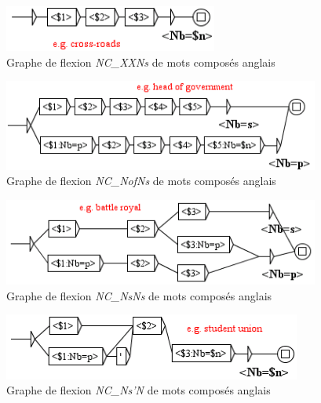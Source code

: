 \begin{figure}[!htb]
  \centering
  \includegraphics[width=7cm]{resources/img/NC'XXNs'EN.png}
  \caption{Graphe de flexion \emph{NC\_XXNs} de mots composés anglais}
  \label{fig:NC'XXNs'EN}
\end{figure}

\begin{figure}[!htb]
  \centering
  \includegraphics[width=10.4cm]{resources/img/NC'NofNs'EN.png}
  \caption{Graphe de flexion \emph{NC\_NofNs} de mots composés anglais}
  \label{fig:NC'NofNs'EN}
\end{figure}

\begin{figure}[!htb]
  \centering
  \includegraphics[width=10.4cm]{resources/img/NC'NsNs'EN.png}
  \caption{Graphe de flexion \emph{NC\_NsNs} de mots composés anglais}
  \label{fig:NC'NsNs'EN}
\end{figure}

\begin{figure}[!htb]
  \centering
  \includegraphics[width=9.8cm]{resources/img/NC'Ns'N'EN.png}
  \caption{Graphe de flexion \emph{NC\_Ns'N} de mots composés anglais}
  \label{fig:NC'Ns'N'EN}
\end{figure}

